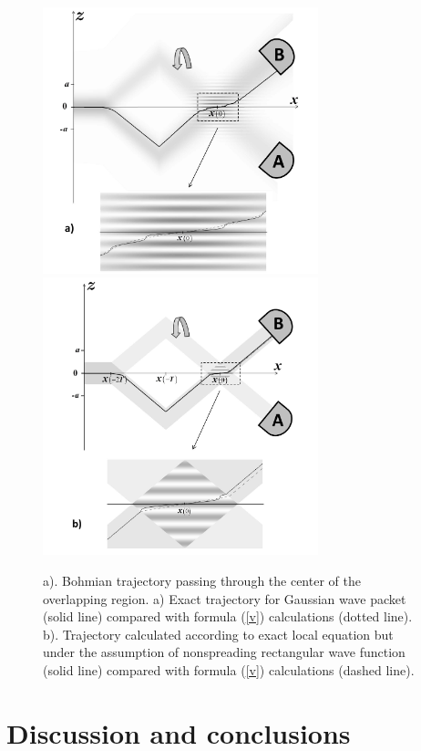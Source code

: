 \documentclass[preprint,tightenlines]{elsarticle}
\begin{document}
\begin{figure}[H]\vspace{-10pt}
  \includegraphics[width=8cm]{11a.pdf}\\\vspace{-10pt}
  \includegraphics[width=8cm]{11b.pdf}\\\vspace{-10pt}
    \caption{a). Bohmian trajectory passing through the center of the overlapping region. a) Exact trajectory for Gaussian wave packet (solid line) compared with formula (\ref{v}) calculations (dotted line). b). Trajectory calculated according to exact local equation but under the assumption of nonspreading rectangular wave function (solid line) compared with formula (\ref{v}) calculations (dashed line).}
\end{figure}

\section{ Discussion and conclusions}
\end{document}
